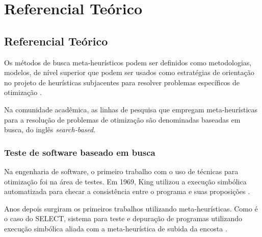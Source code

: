 \part{Referencial Teórico}

\chapter[Referencial Teórico]{Referencial Teórico}




Os métodos de busca meta-heurísticos podem ser definidos como metodologias,
modelos, de nível superior que podem ser usados como estratégias de orientação
no projeto de heurísticas subjacentes para resolver problemas específicos de
otimização \cite{talbi2009metaheuristics}.

Na comunidade acadêmica, as linhas de pesquisa que empregam meta-heurísticas
para a resolução de problemas de otimização são denominadas baseadas em busca,
do inglês \textit{search-based}.

\section{Teste de software baseado em busca}

Na engenharia de software, o primeiro trabalho com o uso de técnicas para
otimização foi na área de testes. Em 1969, King utilizou a execução simbólica
automatizada para checar a consistência entre o programa e suas proposições
\cite{king1969program}. 

Anos depois surgiram os primeiros trabalhos utilizando meta-heurísticas. Como é
o caso do SELECT, sistema para teste e depuração de programas utilizando
execução simbólica aliada com a meta-heurística de subida da encosta
\cite{boyer1975select}.


